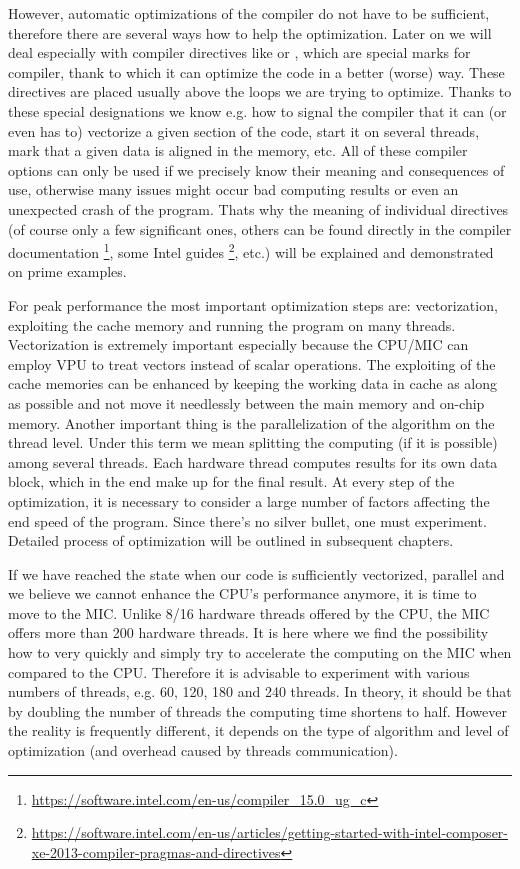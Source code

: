 \par However, automatic optimizations of the compiler do not have to be sufficient, therefore there are several ways how to help the optimization. Later on we will deal especially with compiler directives like  or , which are special marks for compiler, thank to which it can optimize the code in a better (worse) way. These directives are placed usually above the loops we are trying to optimize. Thanks to these special designations we know e.g. how to signal the compiler that it can (or even has to) vectorize a given section of the code, start it on several threads, mark that a given data is aligned in the memory, etc. All of these compiler options can only be used if we precisely know their meaning and consequences of use, otherwise many issues might occur bad computing results or even an unexpected crash of the program. Thats why the meaning of individual directives (of course only a few significant ones, others can be found directly in the compiler documentation \footnote{\url{https://software.intel.com/en-us/compiler_15.0_ug_c}}, some Intel guides \footnote{\url{https://software.intel.com/en-us/articles/getting-started-with-intel-composer-xe-2013-compiler-pragmas-and-directives}}, etc.) will be explained and demonstrated on prime examples.

\par For peak performance the most important optimization steps are: vectorization, exploiting the cache memory and running the program on many threads. Vectorization is extremely important especially because the CPU/MIC can employ VPU to treat vectors instead of scalar operations. The exploiting of the cache memories can be enhanced by keeping the working data in cache as along as possible and not move it needlessly between the main memory and on-chip memory. Another important thing is the parallelization of the algorithm on the thread level. Under this term we mean splitting the computing (if it is possible) among several threads. Each hardware thread computes results for its own data block, which in the end make up for the final result. At every step of the optimization, it is necessary to consider a large number of factors affecting the end speed of the program. Since there's no silver bullet, one must experiment. Detailed process of optimization will be outlined in subsequent chapters.

\par If we have reached the state when our code is sufficiently vectorized, parallel and we believe we cannot enhance the CPU's performance anymore, it is time to move to the MIC. Unlike 8/16 hardware threads offered by the CPU, the MIC offers more than 200 hardware threads. It is here where we find the possibility how to very quickly and simply try to accelerate the computing on the MIC when compared to the CPU. Therefore it is advisable to experiment with various numbers of threads, e.g. 60, 120, 180 and 240 threads. In theory, it should be that by doubling the number of threads the computing time shortens to half. However the reality is frequently different, it depends on the type of algorithm and level of optimization (and overhead caused by threads communication).

